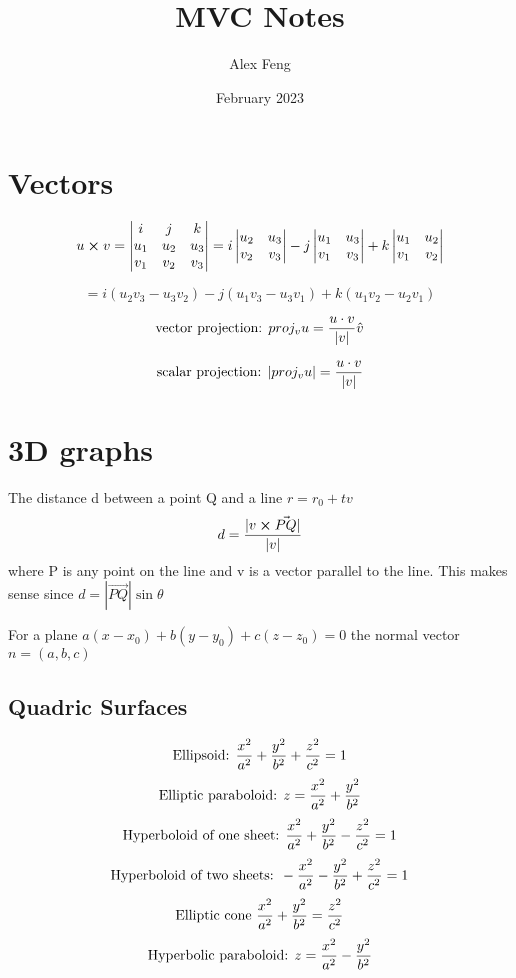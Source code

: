 \documentclass{article}
\title{MVC Notes}
\author{Alex Feng}
\date{February 2023}
\begin{document}
\setlength{\parindent}{0pt}    
\maketitle

\section{Vectors}
$$u \cross v = 
\begin{vmatrix}
    i & j & k \\
    u_1 & u_2 & u_3 \\
    v_1 & v_2 & v_3
\end{vmatrix}
 = i\begin{vmatrix} 
    u_2 & u_3 \\ v_2 & v_3
    
\end{vmatrix}
- j\begin{vmatrix}
    u_1 & u_3 \\
    v_1 & v_3
\end{vmatrix}
+k\begin{vmatrix}
    u_1 & u_2 \\
    v_1 & v_2
\end{vmatrix}$$

$$= i(u_2 v_3 - u_3 v_2) - j(u_1 v_3 - u_3 v_1) + k(u_1 v_2 - u_2 v_1)$$

$$\textnormal{vector projection:  } proj_v u = \frac{u \cdot v}{|v|} \hat{v}$$ 

$$\textnormal{scalar projection:  } |proj_v u| = \frac{u \cdot v}{|v|}$$

\section{3D graphs}

The distance d between a point Q and a line $r=r_0 +tv$
$$d = \frac{|v \cross \Vec{PQ}|}{|v|} $$
where P is any point on the line and v is a vector parallel to the line. This makes sense since $d = |\Vec{PQ}| \sin \theta$

\vskip 30pt

\noindent For a plane $a(x-x_0 ) + b (y- y_0 ) + c(z- z_0) = 0$
the normal vector $n = (a,b,c)$
\pagebreak
\subsection{Quadric Surfaces}
$$\textnormal{Ellipsoid: }\frac{x^2}{a^2} + \frac{y^2}{b^2} + \frac{z^2}{c^2} = 1$$
$$\textnormal{Elliptic paraboloid: }z = \frac{x^2}{a^2} + \frac{y^2}{b^2}$$
$$\textnormal{Hyperboloid of one sheet: }\frac{x^2}{a^2}+\frac{y^2}{b^2}-\frac{z^2}{c^2}=1$$
$$\textnormal{Hyperboloid of two sheets: }-\frac{x^2}{a^2}-\frac{y^2}{b^2}+\frac{z^2}{c^2}=1$$
$$\textnormal{Elliptic cone }\frac{x^2}{a^2}+\frac{y^2}{b^2}=\frac{z^2}{c^2}$$
$$\textnormal{Hyperbolic paraboloid: }z=\frac{x^2}{a^2}-\frac{y^2}{b^2}$$
\end{document}
